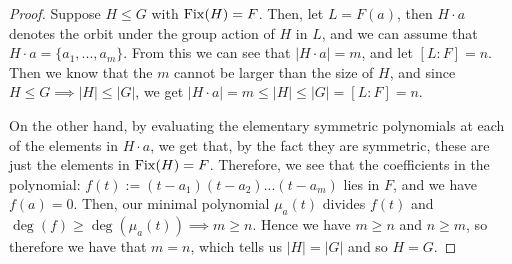 \begin{proof}
    Suppose $H\leq G$ with $\operatorname{Fix}(H)=F$. Then, let $L = F(a)$, then $H \cdot a$ denotes the orbit under the group action of $H$ in $L$, and we can assume that $H \cdot a = \{a_1,...,a_m\}.$ From this we can see that $|H \cdot a| = m$, and let $[L:F]=n$.
    Then we know that the $m$ cannot be larger than the size of $H$, and since $H\leq G \implies |H|\leq|G|$, we get $|H \cdot a| = m \leq |H| \leq |G| = [L:F] = n$.
    
   
    \noindent On the other hand, by evaluating the elementary symmetric polynomials at each of the elements in $H \cdot a$, we get that, by the fact they are symmetric, these are just the elements in $\operatorname{Fix}(H)=F$. Therefore, we see that the coefficients in the polynomial: $f(t) := (t-a_1)(t-a_2)...(t-a_m)$ lies in $F$, and we have $f(a)=0$. Then, our minimal polynomial $\mu_a(t)$ divides $f(t)$ and $\deg(f) \geq \deg(\mu_a(t)) \implies m \geq n$. Hence we have $m \geq n$ and $n \geq m$, so therefore we have that $m=n$, which tells us $|H|=|G|$ and so $H=G.$
\end{proof}



